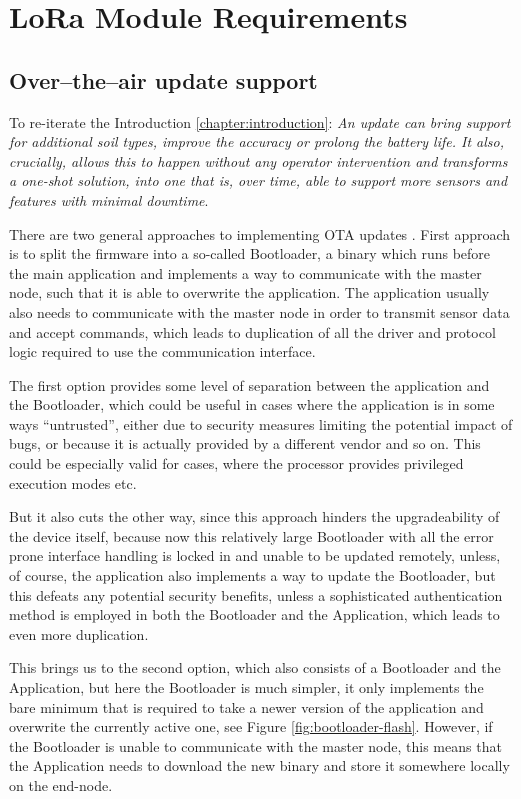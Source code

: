 \section{LoRa Module Requirements}
\subsection{\label{section:ota-update-support}Over--the--air update support}
To re-iterate the Introduction \ref{chapter:introduction}: \emph{An update can bring support for additional soil types, improve the accuracy or prolong the battery life. It also, crucially, allows this to happen without any operator intervention and transforms a one-shot solution, into one that is, over time, able to support more sensors and features with minimal downtime}.

There are two general approaches to implementing OTA updates \cite{bucklin_brown_over--air_2024,noauthor_android_2024}. First approach is to split the firmware into a so-called Bootloader, a binary which runs before the main application and implements a way to communicate with the master node, such that it is able to overwrite the application. The application usually also needs to communicate with the master node in order to transmit sensor data and accept commands, which leads to duplication of all the driver and protocol logic required to use the communication interface.

The first option provides some level of separation between the application and the Bootloader, which could be useful in cases where the application is in some ways ``untrusted'', either due to security measures limiting the potential impact of bugs, or because it is actually provided by a different vendor and so on. This could be especially valid for cases, where the processor provides privileged execution modes etc.

But it also cuts the other way, since this approach hinders the upgradeability of the device itself, because now this relatively large Bootloader with all the error prone interface handling is locked in and unable to be updated remotely, unless, of course, the application also implements a way to update the Bootloader, but this defeats any potential security benefits, unless a sophisticated authentication method is employed in both the Bootloader and the Application, which leads to even more duplication.

This brings us to the second option, which also consists of a Bootloader and the Application, but here the Bootloader is much simpler, it only implements the bare minimum that is required to take a newer version of the application and overwrite the currently active one, see Figure \ref{fig:bootloader-flash}. However, if the Bootloader is unable to communicate with the master node, this means that the Application needs to download the new binary and store it somewhere locally on the end-node.

